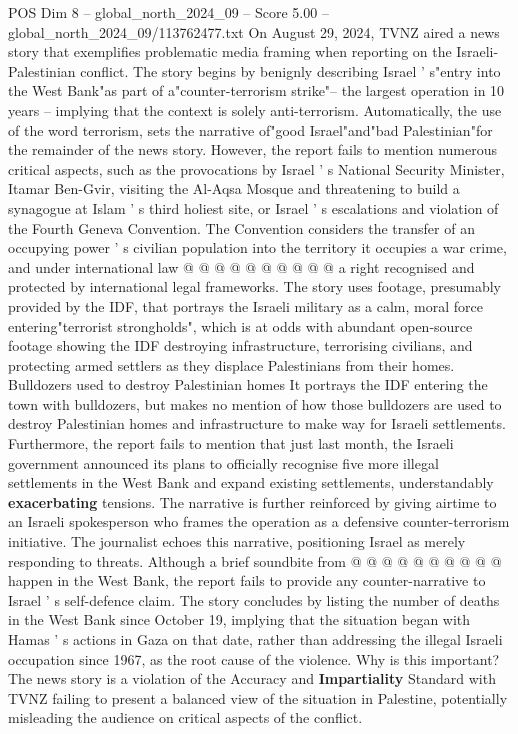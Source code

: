 \begin{textsample}{POS Dim 8 – global\_north\_2024\_09 – Score 5.00 – global\_north\_2024\_09/113762477.txt}
On August 29, 2024, TVNZ aired a news story that exemplifies problematic media framing when reporting on the Israeli-Palestinian conflict.
The story begins by benignly describing Israel ' s"entry into the West Bank"as part of a"counter-terrorism strike"-- the largest operation in 10 years -- implying that the context is solely anti-terrorism.
Automatically, the use of the word terrorism, sets the narrative of"good Israel"and"bad Palestinian"for the remainder of the news story.
However, the report fails to mention numerous critical aspects, such as the provocations by Israel ' s National Security Minister, Itamar Ben-Gvir, visiting the Al-Aqsa Mosque and threatening to build a synagogue at Islam ' s third holiest site, or Israel ' s escalations and violation of the Fourth Geneva Convention.
The Convention considers the transfer of an occupying power ' s civilian population into the territory it occupies a war crime, and under international law @ @ @ @ @ @ @ @ @ @ a right recognised and protected by international legal frameworks.
The story uses footage, presumably provided by the IDF, that portrays the Israeli military as a calm, moral force entering"terrorist strongholds", which is at odds with abundant open-source footage showing the IDF destroying infrastructure, terrorising civilians, and protecting armed settlers as they displace Palestinians from their homes.
Bulldozers used to destroy Palestinian homes It portrays the IDF entering the town with bulldozers, but makes no mention of how those bulldozers are used to destroy Palestinian homes and infrastructure to make way for Israeli settlements.
Furthermore, the report fails to mention that just last month, the Israeli government announced its plans to officially recognise five more illegal settlements in the West Bank and expand existing settlements, understandably \textbf{exacerbating} tensions.
The narrative is further reinforced by giving airtime to an Israeli spokesperson who frames the operation as a defensive counter-terrorism initiative.
The journalist echoes this narrative, positioning Israel as merely responding to threats.
Although a brief soundbite from @ @ @ @ @ @ @ @ @ @ happen in the West Bank, the report fails to provide any counter-narrative to Israel ' s self-defence claim.
The story concludes by listing the number of deaths in the West Bank since October 19, implying that the situation began with Hamas ' s actions in Gaza on that date, rather than addressing the illegal Israeli occupation since 1967, as the root cause of the violence.
Why is this important?
The news story is a violation of the Accuracy and \textbf{Impartiality} Standard with TVNZ failing to present a balanced view of the situation in Palestine, potentially misleading the audience on critical aspects of the conflict.

\end{textsample}
